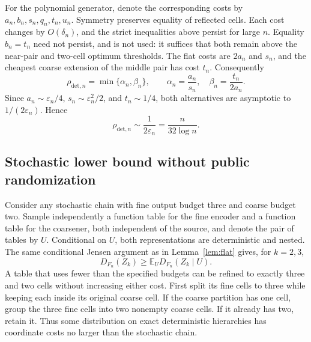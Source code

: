 \documentclass[11pt]{article}
\theoremstyle{definition}\newtheorem{definition}[theorem]{Definition}
\theoremstyle{remark}\newtheorem{remark}[theorem]{Remark}
\newcommand{\E}{\mathbb E}
\newcommand{\detp}{\mathrm{det}}
\begin{document}
For the polynomial generator, denote the corresponding costs by $a_n,b_n,s_n,q_n,t_n,u_n$. Symmetry preserves equality of reflected cells. Each cost changes by $O(\delta_n)$, and the strict inequalities above persist for large $n$. Equality $b_n=t_n$ need not persist, and is not used: it suffices that both remain above the near-pair and two-cell optimum thresholds. The flat costs are $2a_n$ and $s_n$, and the cheapest coarse extension of the middle pair has cost $t_n$. Consequently
\begin{equation}
\rho_{\detp,n}=\min\{\alpha_n,\beta_n\},\qquad
\alpha_n=\frac{a_n}{s_n},\quad\beta_n=\frac{t_n}{2a_n}.
\label{eq:paretopoly}
\end{equation}
Since $a_n\sim\varepsilon_n/4$, $s_n\sim\varepsilon_n^2/2$, and $t_n\sim1/4$, both alternatives are asymptotic to $1/(2\varepsilon_n)$. Hence
\begin{equation}
\rho_{\detp,n}\sim\frac1{2\varepsilon_n}=\frac{n}{32\log n}.
\label{eq:detasymptotic}
\end{equation}

\subsection{Stochastic lower bound without public randomization}
\label{sec:stochasticlower}
Consider any stochastic chain with fine output budget three and coarse budget two. Sample independently a function table for the fine encoder and a function table for the coarsener, both independent of the source, and denote the pair of tables by $U$. Conditional on $U$, both representations are deterministic and nested. The same conditional Jensen argument as in Lemma~\ref{lem:flat} gives, for $k=2,3$,
\begin{equation}
D_{F_n}(Z_k)\ge\E_U D_{F_n}(Z_k\mid U).
\label{eq:reveal}
\end{equation}
A table that uses fewer than the specified budgets can be refined to exactly three and two cells without increasing either cost. First split its fine cells to three while keeping each inside its original coarse cell. If the coarse partition has one cell, group the three fine cells into two nonempty coarse cells. If it already has two, retain it. Thus some distribution on exact deterministic hierarchies has coordinate costs no larger than the stochastic chain.
\end{document}
